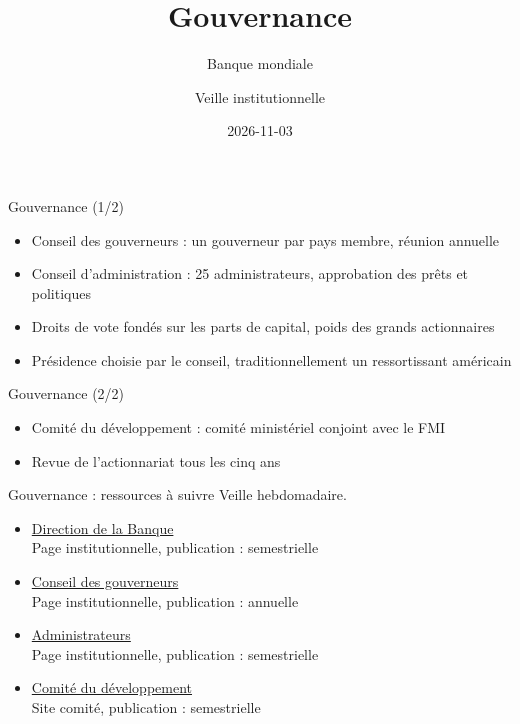 \documentclass[aspectratio=169,11pt]{beamer}
\title{Gouvernance}
\subtitle{Banque mondiale}
\author{Veille institutionnelle}
\date{2026-11-03}
\begin{document}
\begin{frame}\titlepage\end{frame}

\begin{frame}{Gouvernance (1/2)}
\begin{itemize}
\item Conseil des gouverneurs : un gouverneur par pays membre, réunion annuelle
\item Conseil d'administration : 25 administrateurs, approbation des prêts et politiques
\item Droits de vote fondés sur les parts de capital, poids des grands actionnaires
\item Présidence choisie par le conseil, traditionnellement un ressortissant américain
\end{itemize}
\end{frame}

\begin{frame}{Gouvernance (2/2)}
\begin{itemize}
\item Comité du développement : comité ministériel conjoint avec le FMI
\item Revue de l'actionnariat tous les cinq ans
\end{itemize}
\end{frame}

\begin{frame}{Gouvernance : ressources à suivre}
\small
Veille hebdomadaire.
\begin{itemize}
\item \href{https://www.worldbank.org/en/about/leadership}{Direction de la Banque}\\{\footnotesize Page institutionnelle, publication : semestrielle}
\item \href{https://www.worldbank.org/en/about/leadership/governors}{Conseil des gouverneurs}\\{\footnotesize Page institutionnelle, publication : annuelle}
\item \href{https://www.worldbank.org/en/about/leadership/directors}{Administrateurs}\\{\footnotesize Page institutionnelle, publication : semestrielle}
\item \href{https://www.devcommittee.org}{Comité du développement}\\{\footnotesize Site comité, publication : semestrielle}
\end{itemize}
\end{frame}
\end{document}
